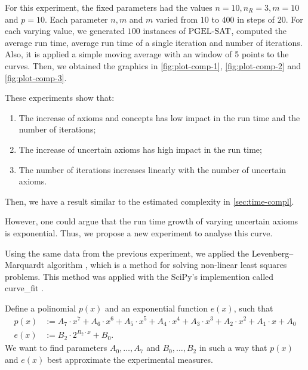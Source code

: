 For this experiment, the fixed parameters had the values $n = 10, n_R = 3, m = 10$ and $p = 10$. Each parameter $n, m$ and $m$ varied from $10$ to $400$ in steps of $20$. For each varying value, we generated $100$ instances of $\text{PGEL-SAT}$, computed the average run time, average run time of a single iteration and number of iterations. Also, it is applied a simple moving average with an window of 5 points to the curves.  Then, we obtained the graphics in \autoref{fig:plot-comp-1}, \autoref{fig:plot-comp-2} and \autoref{fig:plot-comp-3}. 

These experiments show that:
\begin{enumerate}[label=(\alph*)]
  \item The increase of axioms and concepts has low impact in the run time and the number of iterations;
  \item The increase of uncertain axioms has high impact in the run time;
  \item The number of iterations increases linearly with the number of uncertain axioms.
\end{enumerate}
Then, we have a result similar to the estimated complexity in \autoref{sec:time-compl}.

However, one could argue that the run time growth of varying uncertain axioms is exponential. Thus, we propose a new experiment to analyse this curve.

Using the same data from the previous experiment, we applied the Levenberg–Marquardt algorithm \citep{levenberg1944method,marquardt1963algorithm}, which is a method for solving non-linear least squares problems. This method was applied with the SciPy's implemention called \textsf{curve\_fit} \citep{2020SciPy-NMeth}. 

Define a polinomial $p(x)$ and an exponential function $e(x)$, such that
\begin{align*}
  p(x) &:= A_7 \cdot x^7 + A_6 \cdot x^6 + A_5 \cdot x^5 +A_4 \cdot x^4 + A_3 \cdot x^3 + A_2 \cdot x^2 + A_1 \cdot x + A_0\\
  e(x) &:= B_2 \cdot 2^{B_2 \cdot x} + B_0.
\end{align*}
We want to find parameters $A_0, \dots, A_7$ and $B_0, \dots, B_2$ in such a way that $p(x)$ and $e(x)$ best approximate the experimental measures. 

